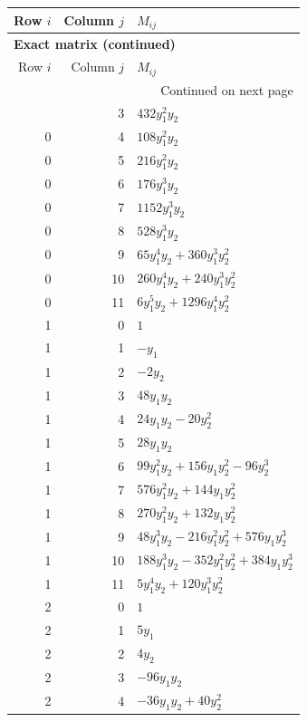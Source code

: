 \documentclass[10pt,a4paper]{article}
\begin{document}
{\small\setlength{\tabcolsep}{7pt}\begin{longtable}{rrp{125mm}}
\toprule Row $i$ & Column $j$ & $M_{ij}$\\\midrule\endfirsthead
\multicolumn{3}{l}{\textbf{Exact matrix (continued)}}\\
\toprule Row $i$ & Column $j$ & $M_{ij}$\\\midrule\endhead
\midrule\multicolumn{3}{r}{Continued on next page}\\\endfoot\bottomrule\endlastfoot
0 & 3 & $432 y_{1}^{2} y_{2}$\\
0 & 4 & $108 y_{1}^{2} y_{2}$\\
0 & 5 & $216 y_{1}^{2} y_{2}$\\
0 & 6 & $176 y_{1}^{3} y_{2}$\\
0 & 7 & $1152 y_{1}^{3} y_{2}$\\
0 & 8 & $528 y_{1}^{3} y_{2}$\\
0 & 9 & $65 y_{1}^{4} y_{2} + 360 y_{1}^{3} y_{2}^{2}$\\
0 & 10 & $260 y_{1}^{4} y_{2} + 240 y_{1}^{3} y_{2}^{2}$\\
0 & 11 & $6 y_{1}^{5} y_{2} + 1296 y_{1}^{4} y_{2}^{2}$\\
1 & 0 & $1$\\
1 & 1 & $- y_{1}$\\
1 & 2 & $- 2 y_{2}$\\
1 & 3 & $48 y_{1} y_{2}$\\
1 & 4 & $24 y_{1} y_{2} - 20 y_{2}^{2}$\\
1 & 5 & $28 y_{1} y_{2}$\\
1 & 6 & $99 y_{1}^{2} y_{2} + 156 y_{1} y_{2}^{2} - 96 y_{2}^{3}$\\
1 & 7 & $576 y_{1}^{2} y_{2} + 144 y_{1} y_{2}^{2}$\\
1 & 8 & $270 y_{1}^{2} y_{2} + 132 y_{1} y_{2}^{2}$\\
1 & 9 & $48 y_{1}^{3} y_{2} - 216 y_{1}^{2} y_{2}^{2} + 576 y_{1} y_{2}^{3}$\\
1 & 10 & $188 y_{1}^{3} y_{2} - 352 y_{1}^{2} y_{2}^{2} + 384 y_{1} y_{2}^{3}$\\
1 & 11 & $5 y_{1}^{4} y_{2} + 120 y_{1}^{3} y_{2}^{2}$\\
2 & 0 & $1$\\
2 & 1 & $5 y_{1}$\\
2 & 2 & $4 y_{2}$\\
2 & 3 & $- 96 y_{1} y_{2}$\\
2 & 4 & $- 36 y_{1} y_{2} + 40 y_{2}^{2}$\\

\end{longtable}}
\end{document}
